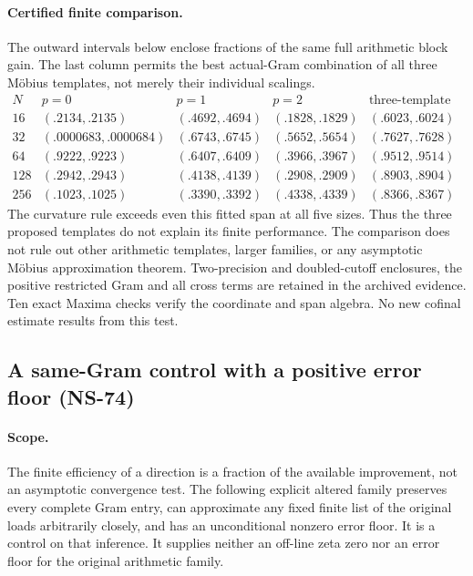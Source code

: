 \documentclass[11pt]{article}
\theoremstyle{remark}
\begin{document}
\paragraph{Certified finite comparison.}
The outward intervals below enclose fractions of the same full arithmetic
block gain. The last column permits the best actual-Gram combination of
all three M\"obius templates, not merely their individual scalings.
\[
\begin{array}{c|cccc}
N& p=0&p=1&p=2&\text{three-template span}\\ \hline
16&(.2134,.2135)&(.4692,.4694)&(.1828,.1829)&(.6023,.6024)\\
32&(.0000683,.0000684)&(.6743,.6745)&(.5652,.5654)&(.7627,.7628)\\
64&(.9222,.9223)&(.6407,.6409)&(.3966,.3967)&(.9512,.9514)\\
128&(.2942,.2943)&(.4138,.4139)&(.2908,.2909)&(.8903,.8904)\\
256&(.1023,.1025)&(.3390,.3392)&(.4338,.4339)&(.8366,.8367)
\end{array}
\]
The curvature rule exceeds even this fitted span at all five sizes.
Thus the three proposed templates do not explain its finite performance.
The comparison does not rule out other arithmetic templates, larger
families, or any asymptotic M\"obius approximation theorem.
Two-precision and doubled-cutoff enclosures, the positive restricted Gram
and all cross terms are retained in the archived evidence. Ten exact
Maxima checks verify the coordinate and span algebra. No new cofinal
estimate results from this test.

\subsection{A same-Gram control with a positive error floor (NS-74)}
\label{sec:ns74-same-gram-control}

\paragraph{Scope.}
The finite efficiency of a direction is a fraction of the available
improvement, not an asymptotic convergence test. The following explicit
altered family preserves every complete Gram entry, can approximate any
fixed finite list of the original loads arbitrarily closely, and has an
unconditional nonzero error floor. It is a control on that inference.
It supplies neither an off-line zeta zero nor an error floor for the
original arithmetic family.
\end{document}
